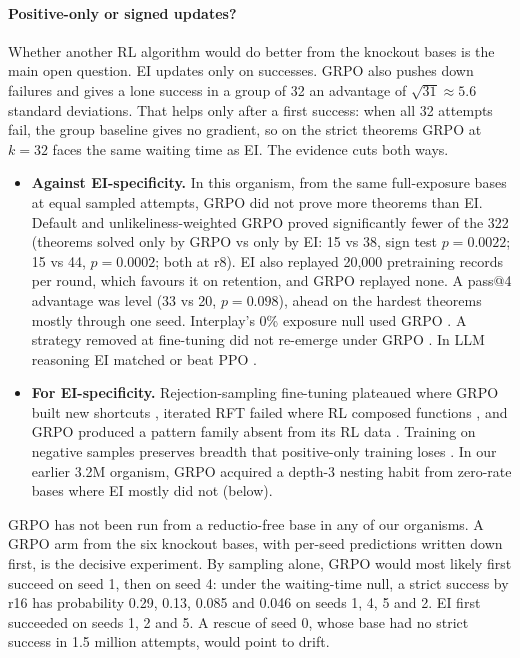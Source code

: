 \paragraph{Positive-only or signed updates?} Whether another RL algorithm would do better from the knockout bases is the
main open question. EI updates only on successes. GRPO also pushes down failures and gives a lone success in a group of
32 an advantage of $\sqrt{31} \approx 5.6$ standard deviations. That helps only after a first success: when all 32
attempts fail, the group baseline gives no gradient, so on the strict theorems GRPO at $k=32$ faces the same waiting time
as EI. The evidence cuts both ways.
\begin{itemize}
\item \textbf{Against EI-specificity.} In this organism, from the same full-exposure bases at equal sampled attempts,
GRPO did not prove more theorems than EI. Default and unlikeliness-weighted GRPO proved significantly fewer of the 322
(theorems solved only by GRPO vs only by EI: 15 vs 38, sign test $p = 0.0022$; 15 vs 44, $p = 0.0002$; both at r8).
EI also replayed 20,000 pretraining records per round, which favours it on retention, and GRPO replayed none. A pass@4
advantage was level (33 vs 20, $p = 0.098$), ahead on the hardest theorems mostly through one seed. Interplay's 0\%
exposure null used GRPO \citep{zhang2025interplay}. A strategy removed at fine-tuning did not re-emerge under GRPO
\citep{krishnamurthy2026select}. In LLM reasoning EI matched or beat PPO \citep{havrilla2024teaching}.
\item \textbf{For EI-specificity.} Rejection-sampling fine-tuning plateaued where GRPO built new shortcuts
\citep{abdulsalam2026rewrite}, iterated RFT failed where RL composed functions \citep{yuan2025fgx}, and GRPO produced a
pattern family absent from its RL data \citep{park2025countdown}. Training on negative samples preserves breadth that
positive-only training loses \citep{zhu2025nsr}. In our earlier 3.2M organism, GRPO acquired a depth-3 nesting habit from
zero-rate bases where EI mostly did not (below).
\end{itemize}
GRPO has not been run from a reductio-free base in any of our organisms. A GRPO arm from the six knockout bases, with per-seed
predictions written down first, is the decisive experiment. By sampling alone, GRPO would most likely first succeed \rv{} on
seed 1, then on seed 4: under the waiting-time null, a strict success by r16 has probability 0.29, 0.13, 0.085 and 0.046
on seeds 1, 4, 5 and 2. EI first succeeded on seeds 1, 2 and 5. A rescue of seed 0, whose base had no strict success in 1.5 million attempts, would point to
drift.

